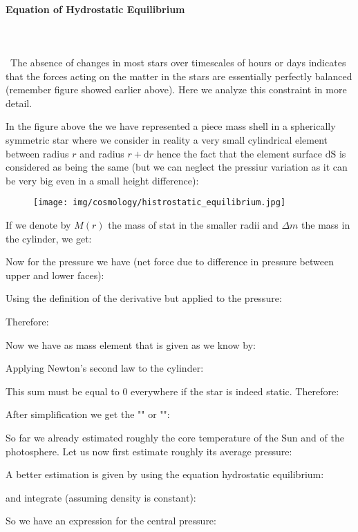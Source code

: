 	\paragraph{Equation of Hydrostatic Equilibrium}\mbox{}\\\\\
	The absence of changes in most stars over timescales of hours or days indicates that the forces acting on the matter in the stars are essentially perfectly balanced (remember figure showed earlier above). Here we analyze this constraint in more detail.

	In the figure above the we have represented a piece mass shell in a spherically symmetric star where we consider in reality a very small cylindrical element between radius $r$ and radius $r + \mathrm{d}r$ hence the fact that the element surface $\mathrm{dS}$ is considered as being the same (but we can neglect the pressiur variation as it can be very big even in a small height difference):
	\begin{figure}[H]
		\centering
		\texttt{[image: img/cosmology/histrostatic\_equilibrium.jpg]}	
	\end{figure}
	If we denote by $M(r)$ the mass of stat in the smaller radii and $\Delta m$ the mass in the cylinder, we get:
	
	Now for the pressure we have (net force due to difference in pressure between upper and lower faces):
	
	Using the definition of the derivative but applied to the pressure:
	
	Therefore:
	
	Now we have as mass element that is given as we know by:
	
	Applying Newton's second law to the cylinder:
	
	This sum must be equal to $0$ everywhere if the star is indeed static. Therefore:
	
	After simplification we get the "" or "":
	
	So far we already estimated roughly the core temperature of the Sun and of the photosphere. Let us now first estimate roughly its average pressure:
	
	A better estimation is given by using the equation hydrostatic equilibrium:
	
	and integrate (assuming density is constant):
	
	So we have an expression for the central pressure:
	
